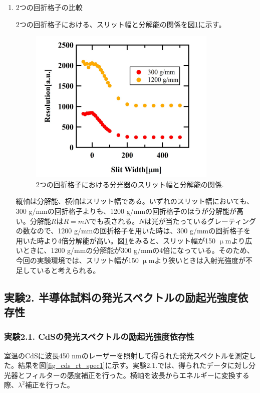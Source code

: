 \documentclass[11pt,a4j]{jsarticle}
\begin{document}
\begin{enumerate}
       \newpage
 \item 2つの回折格子の比較

       2つの回折格子における、スリット幅と分解能の関係を図\ref{fig_resolution1}に示す。

       \begin{figure}[ht]
        \centering
        \includegraphics[clip,width=9cm]{start1_Resolution.jpg}
        \caption{2つの回折格子における分光器のスリット幅と分解能の関係.}
        \label{fig_resolution1}
       \end{figure}

       縦軸は分解能、横軸はスリット幅である。いずれのスリット幅においても、300 g/mmの回折格子よりも、1200 g/mmの回折格子のほうが分解能が高い。分解能$R$は$R=mN$でも表される。$N$は光が当たっているグレーティングの数なので、1200 g/mmの回折格子を用いた時は、300 g/mmの回折格子を用いた時より4倍分解能が高い。図\ref{fig_resolution1}をみると、スリット幅が150 $\upmu$mより広いときに、1200 g/mmの分解能が300 g/mmの4倍になっている。そのため、今回の実験環境では、スリット幅が150 $\upmu$mより狭いときは入射光強度が不足していると考えられる。%

\end{enumerate}%

\newpage

\subsection{実験2. 半導体試料の発光スペクトルの励起光強度依存性}
\subsubsection{実験2.1. CdSの発光スペクトルの励起光強度依存性}

室温のCdSに波長450 nmのレーザーを照射して得られた発光スペクトルを測定した。結果を図\ref{fig_cds_rt_spec1}に示す。実験2.1.では、得られたデータに対し分光器とフィルターの感度補正を行った。横軸を波長からエネルギーに変換する際、$\lambda^2$補正を行った。
\end{document}
